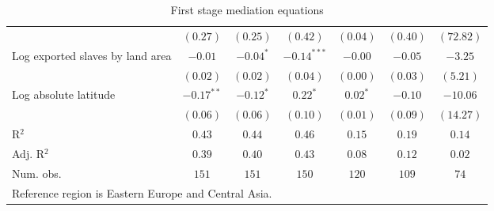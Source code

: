 \begin{sidewaystable}[H]
\begin{center}
{\begin{tabular}{l c c c c c c}
                                 & $(0.27)$     & $(0.25)$       & $(0.42)$        & $(0.04)$   & $(0.40)$        & $(72.82)$        \\
Log exported slaves by land area & $-0.01$      & $-0.04^{*}$    & $-0.14^{***}$   & $-0.00$    & $-0.05$         & $-3.25$          \\
                                 & $(0.02)$     & $(0.02)$       & $(0.04)$        & $(0.00)$   & $(0.03)$        & $(5.21)$         \\
Log absolute latitude            & $-0.17^{**}$ & $-0.12^{*}$    & $0.22^{*}$      & $0.02^{*}$ & $-0.10$         & $-10.06$         \\
                                 & $(0.06)$     & $(0.06)$       & $(0.10)$        & $(0.01)$   & $(0.09)$        & $(14.27)$        \\
\hline
R$^2$                            & $0.43$       & $0.44$         & $0.46$          & $0.15$     & $0.19$          & $0.14$           \\
Adj. R$^2$                       & $0.39$       & $0.40$         & $0.43$          & $0.08$     & $0.12$          & $0.02$           \\
Num. obs.                        & $151$        & $151$          & $150$           & $120$      & $109$           & $74$             \\
\hline
\multicolumn{7}{l}{\scriptsize{Reference region is Eastern Europe and Central Asia.}}
\end{tabular}
}
\caption{First stage mediation equations}
\label{MediationTable}
\end{center}
\end{sidewaystable}
